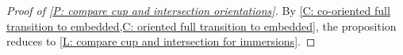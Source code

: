 \begin{proof}[Proof of \cref{P: compare cup and intersection orientations}]
By \cref{C: co-oriented full transition to embedded,C: oriented full transition to embedded}, the proposition reduces to \cref{L: compare cup and intersection for immersions}.
\end{proof}






\begin{comment}

OLD VERSION OF FIBER PRODUCTS FROM HERE THROUGH REST OF THE FILE

\subsubsection{Co-orientability of fiber products}

Before defining fiber product co-orientations, we first want to ensure that fiber products of co-orientable maps are themselves co-orientable. This will free us to then determine the specific co-orientations by working locally. 

\begin{lemma}\label{L: co-orientable pullback}
Suppose $g:W\to M$ and  $f:V\to M$ are transverse. Then:

\begin{enumerate}
\item If $g$ is co-orienteable, the pullback $g^*:P\to V$ is  co-orientable. 

\item If $g$ is proper, the pullback $g^*:P\to V$ is proper. 
\end{enumerate}

\end{lemma}
Note that $f$ need not be co-orientable or proper for this lemma to apply.
\begin{proof}
We first show that the pullback is proper. Let us label our maps 
\begin{diagram}
P&\rTo^{\pi_W} & W\\
\dTo^{g^*=\pi_V}&&\dTo_g\\
V&\rTo^f&M.
\end{diagram}


Suppose $K\subset V$ is compact. We have
\begin{align*}
\pi_V^{-1}(K)&=\{x\in P\mid \pi_V(x)\in K\}\\
&\subset \{x\in P\mid f\pi_V(x)\in f(K)\} \\
&=\{x\in P\mid g\pi_W(x)\in f(K)\} \\
&=\{x\in P\mid \pi_W(x)\in g^{-1}(f(K))\}.
\end{align*}
So $\pi_V^{-1}(K)\subset K\times g^{-1}(f(K))\subset V\times W$. But this is a product of compact sets as $g$ is proper. So $\pi_V$ is proper.


\end{comment}

